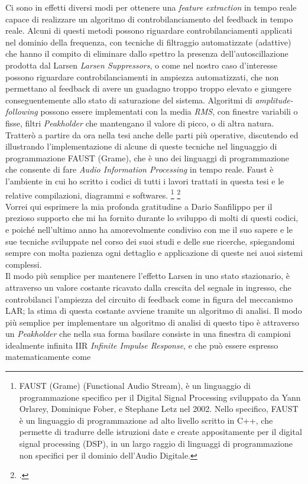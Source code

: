Ci sono in effetti diversi modi per ottenere una \textit{feature extraction} 
in tempo reale capace di realizzare un algoritmo di controbilanciamento 
del feedback in tempo reale.
Alcuni di questi metodi possono riguardare controbilanciamenti 
applicati nel dominio della frequenza,
con tecniche di filtraggio automatizzate (adattive) che
hanno il compito di eliminare dallo spettro la presenza dell'autoscillazione prodotta dal Larsen \textit{Larsen Suppressors},
o come nel nostro caso d’interesse possono riguardare controbilanciamenti in ampiezza
automatizzati, che non permettano al feedback di avere un guadagno troppo troppo elevato 
e giungere conseguentemente allo stato di saturazione del sistema.
Algoritmi di \textit{amplitude-following} possono essere implementati 
con la media \textit{RMS}, con finestre variabili o fisse, 
filtri \textit{Peakholder} che mantengano il valore di picco, o di altra natura. \\
Tratterò a partire da ora nella tesi anche delle parti più operative, 
discutendo ed illustrando l'implementazione
di alcune di queste tecniche nel linguaggio di programmazione FAUST (Grame), 
che è uno dei linguaggi di programmazione
che consente di fare \textit{Audio Information Processing} in tempo reale.
Faust è l'ambiente in cui ho scritto i codici di tutti i lavori trattati
in questa tesi e le relative compilazioni, diagrammi e softwares.
\footnote{FAUST (Grame) (Functional Audio Stream), 
è un linguaggio di programmazione specifico per il Digital Signal
Processing sviluppato da Yann Orlarey, Dominique Fober, e Stephane Letz nel
2002. Nello specifico, FAUST è un linguaggio di programmazione ad alto livello
scritto in C++, che permette di tradurre delle istruzioni date e create 
appositamente per il digital signal processing (DSP), in un largo raggio di linguaggi
di programmazione non specifici per il dominio dell’Audio Digitale.} \footcite{https://faust.grame.fr/} \\
Vorrei qui esprimere la mia profonda gratitudine a 
Dario Sanfilippo per il prezioso supporto che mi ha fornito durante 
lo sviluppo di molti di questi codici,
e poiché nell'ultimo anno ha amorevolmente condiviso con me il suo sapere e le sue tecniche 
sviluppate nel corso dei suoi studi e delle sue ricerche, 
spiegandomi sempre con molta pazienza ogni dettaglio e applicazione 
di queste nei auoi sistemi complessi. \\
Il modo più semplice per mantenere l’effetto Larsen in uno stato stazionario, è attraverso un
valore costante ricavato dalla crescita del segnale in ingresso,
che controbilanci l’ampiezza del circuito di feedback come in figura del meccanismo LAR;
la stima di questa costante avviene tramite un algoritmo di analisi.
Il modo più semplice per implementare un algoritmo di analisi di questo tipo
è attraverso un \textit{Peakholder} che nella sua forma basilare consiste in una finestra 
di campioni idealmente infinita IIR \textit{Infinite Impulse Response},
e che può essere espresso matematicamente come

